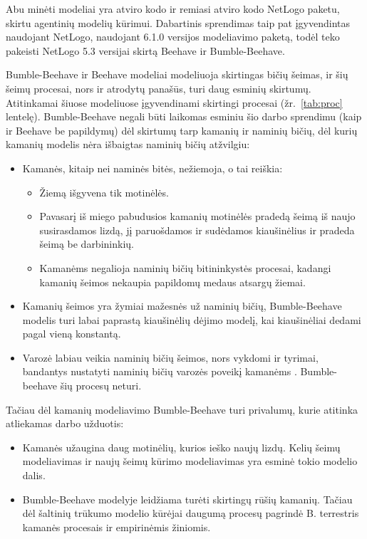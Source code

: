 \documentclass{VUMIFPSmagistrinis}
\begin{document}
Abu minėti modeliai yra atviro kodo ir remiasi atviro kodo NetLogo  paketu, skirtu agentinių modelių kūrimui. Dabartinis sprendimas taip pat įgyvendintas naudojant NetLogo, naudojant 6.1.0 versijos modeliavimo paketą, todėl teko pakeisti NetLogo 5.3 versijai skirtą Beehave ir Bumble-Beehave.

Bumble-Beehave ir Beehave modeliai modeliuoja skirtingas bičių šeimas, ir šių šeimų procesai, nors ir atrodytų panašūs, turi daug esminių skirtumų. Atitinkamai šiuose modeliuose įgyvendinami skirtingi procesai (žr.~\ref{tab:proc} lentelę).
Bumble-Beehave negali būti laikomas esminiu šio darbo sprendimu (kaip ir Beehave be papildymų) dėl skirtumų tarp kamanių ir naminių bičių, dėl kurių kamanių modelis nėra išbaigtas naminių bičių atžvilgiu:
\begin{itemize}
\item Kamanės, kitaip nei naminės bitės, nežiemoja, o tai reiškia:
\begin{itemize}
\item Žiemą išgyvena tik motinėlės.
\item Pavasarį iš miego pabudusios kamanių motinėlės pradedą šeimą iš naujo susirasdamos lizdą, jį paruošdamos ir sudėdamos kiaušinėlius ir pradeda šeimą be darbininkių. 
\item Kamanėms negalioja naminių bičių bitininkystės procesai, kadangi kamanių šeimos nekaupia papildomų medaus atsargų žiemai.
\end{itemize}
\item Kamanių šeimos yra žymiai mažesnės už naminių bičių, Bumble-Beehave modelis turi labai paprastą kiaušinėlių dėjimo modelį, kai kiaušinėliai dedami pagal vieną konstantą.
\item Varozė labiau veikia naminių bičių šeimos, nors vykdomi ir tyrimai, bandantys nustatyti naminių bičių varozės poveikį kamanėms \cite{MTD19}. Bumble-beehave šių procesų neturi. 
\end{itemize}

Tačiau dėl kamanių modeliavimo Bumble-Beehave turi privalumų, kurie atitinka atliekamas darbo užduotis:
\begin{itemize}
\item Kamanės užaugina daug motinėlių, kurios ieško naujų lizdų. Kelių šeimų modeliavimas ir naujų šeimų kūrimo modeliavimas yra esminė tokio modelio dalis.
\item Bumble-Beehave modelyje leidžiama turėti skirtingų rūšių kamanių. Tačiau dėl šaltinių trūkumo modelio kūrėjai daugumą procesų pagrindė B. terrestris kamanės procesais ir empirinėmis žiniomis.
\end{itemize}
\end{document}
